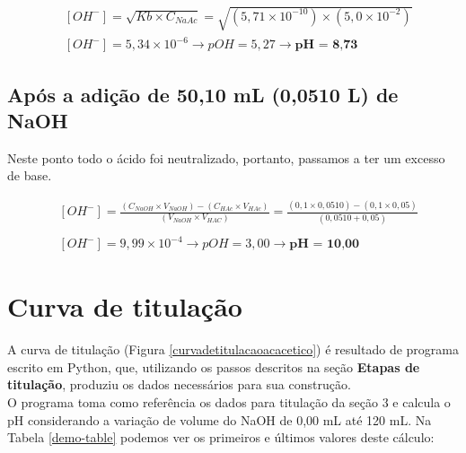 \documentclass[a4paper, 12pt]{article}
\begin{document}
\begin{fleqn}
	\begin{align*}
		&[OH^{-}] = \sqrt{Kb \times C_{NaAc}} = \sqrt{(5,71 \times 10^{-10}) \times (5,0 \times 10^{-2})} \\
		&[OH^{-}] = 5,34 \times 10^{-6} \rightarrow pOH = 5,27 \rightarrow \textbf{pH = 8,73}
	\end{align*}
\end{fleqn}

\subsection{Após a adição de 50,10 mL (0,0510 L) de NaOH}
Neste ponto todo o ácido foi neutralizado, portanto, passamos a ter um excesso de base.

\begin{fleqn}
	\begin{align*}
		&[OH^{-}] = \frac{ (C_{NaOH} \times V_{NaOH}) - (C_{HAc} \times V_{HAc}) }{ (V_{NaOH} \times V_{HAC}) } = \frac{ (0,1 \times 0,0510) - (0,1 \times 0,05) }{ (0,0510 + 0,05) } \\ \\	
		&[OH^{-}] = 9,99 \times 10^{-4} \rightarrow pOH = 3,00 \rightarrow \textbf{pH = 10,00}
	\end{align*}
\end{fleqn}

\section{Curva de titulação}
A curva de titulação (Figura \ref{curvadetitulacaoacacetico}) é resultado de programa escrito em Python, que, utilizando os passos descritos na seção \textbf{Etapas de titulação}, produziu os dados necessários para sua construção. \\

O programa toma como referência os dados para titulação da seção 3 e calcula o pH considerando a variação de volume do NaOH de 0,00 mL até 120 mL. Na Tabela \ref{demo-table} podemos ver os primeiros e últimos valores deste cálculo:
\end{document}
